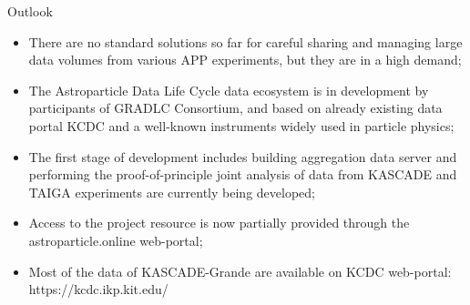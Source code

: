 \begin{frame}{Outlook}
    \begin{itemize}
      \setlength{\itemsep}{0pt}
        \item There are no standard solutions so far for careful sharing and managing large data volumes from various APP experiments, but they are in a high demand;
        \item The Astroparticle Data Life Cycle data ecosystem is in development by participants of GRADLC Consortium, and based on already existing data portal KCDC and a well-known instruments widely used in particle physics;
        \item The first stage of development includes building aggregation data server and performing the proof-of-principle joint analysis of data from KASCADE and TAIGA experiments are currently being developed;
        \item Access to the project resource is now partially provided through the astroparticle.online web-portal;
        \item Most of the data of KASCADE-Grande are available on KCDC web-portal: \textcolor{kit-blue70}{https://kcdc.ikp.kit.edu/}
    \end{itemize}
\end{frame}

